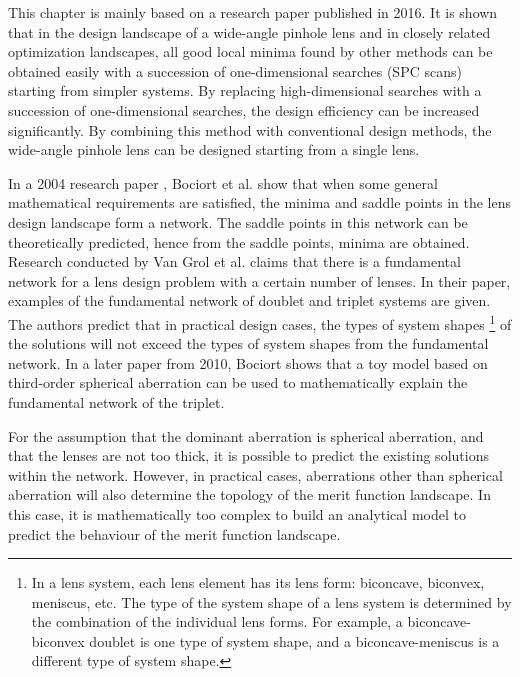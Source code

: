 This chapter is mainly based on a research paper\cite{HouSimple16} published in 2016. It is shown that in the design landscape of a wide-angle pinhole lens and in closely related optimization landscapes, all good local minima found by other methods can be obtained easily with a succession of one-dimensional searches (SPC scans) starting from simpler systems. By replacing high-dimensional searches with a succession of one-dimensional searches, the design efficiency can be increased significantly. By combining this method with conventional design methods, the wide-angle pinhole lens can be designed starting from a single lens.

In a 2004 research paper \cite{BociortThinLens2004}, Bociort et al. show that when some general mathematical requirements are satisfied, %
the minima and saddle points in the lens design landscape form a network. The saddle points in this network can be theoretically predicted, hence from the saddle points, minima are obtained. Research conducted by Van Grol et al.\cite{PascalTriplet2009} claims that there is a fundamental network for a lens design problem with a certain number of lenses. In their paper, examples of the fundamental network of doublet and triplet systems are given. The authors predict that in practical design cases, the types of system shapes \footnote{In a lens system, each lens element has its lens form: biconcave, biconvex, meniscus, etc. The type of the system shape of a lens system is determined by the combination of the individual lens forms. For example, a biconcave-biconvex doublet is one type of system shape, and a biconcave-meniscus is a different type of system shape. } of the solutions will not exceed the types of system shapes from the fundamental network. In a later paper from 2010\cite{BociortTripletExplained2010}\cite{BociortToyModel2010}, Bociort shows that a toy model based on third-order spherical aberration can be used to mathematically explain the fundamental network of the triplet. 

For the assumption that the dominant aberration is spherical aberration, and that the lenses are not too thick, it is possible to predict the existing solutions within the network. However, in practical cases, aberrations other than spherical aberration will also determine the topology of the merit function landscape. In this case, it is mathematically too complex to build an analytical model to predict the behaviour of the merit function landscape.

